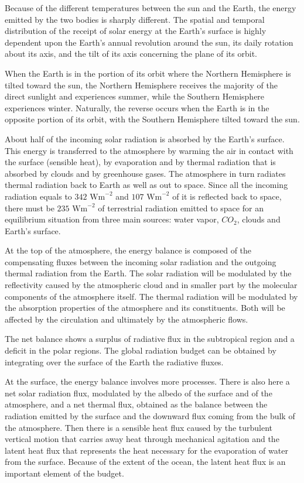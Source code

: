 Because of the different temperatures between the sun and the Earth, the energy emitted by the two bodies is sharply different. The spatial and temporal distribution of the receipt of solar energy at the Earth’s surface is highly dependent upon the Earth's annual revolution around the sun, its daily rotation about its axis, and the tilt of its axis concerning the plane of its orbit. 

When the Earth is in the portion of its orbit where the Northern Hemisphere is tilted toward the sun, the Northern Hemisphere receives the majority of the direct sunlight and experiences summer, while the Southern Hemisphere experiences winter. Naturally, the reverse occurs when the Earth is in the opposite portion of its orbit, with the Southern Hemisphere tilted toward the sun. 

About half of the incoming solar radiation is absorbed by the Earth's surface. This energy is transferred to the atmosphere by warming the air in contact with the surface (sensible heat), by evaporation and by thermal radiation that is absorbed by clouds and by greenhouse gases. The atmosphere in turn radiates thermal radiation back to Earth as well as out to space. Since all the
incoming radiation equals to $342 \,\, \text{Wm}^{-2}$ and $107 \,\, \text{Wm}^{-2}$ of it is reflected back to space, there must be
$235\,\, \text{Wm}^{-2}$ of terrestrial radiation emitted to space for an equilibrium situation from three main sources: water vapor, $CO_2$, clouds and Earth’s surface. 

 At the top of the atmosphere, the energy balance is composed of the compensating fluxes between the incoming solar radiation and the outgoing thermal radiation from the Earth. The solar radiation will be modulated by the reflectivity caused by the atmospheric cloud and in smaller part by the molecular components of the atmosphere itself. The thermal radiation will be modulated by the absorption properties of the atmosphere and its constituents. Both will be affected by the circulation and ultimately by the atmospheric flows. 

The net balance shows a surplus of radiative flux in the subtropical region and a deficit in the polar regions. The global radiation budget can be obtained by integrating over the surface of the Earth the radiative fluxes. 

At the surface, the energy balance involves more processes. There is also here a net solar radiation flux, modulated by the albedo of the surface and of the atmosphere, and a net thermal flux, obtained as the balance between the radiation emitted by the surface and the downward flux coming from the bulk of the atmosphere. Then there is a sensible heat flux caused by the turbulent vertical motion that carries away heat through mechanical agitation and the latent heat flux that represents the heat necessary for the evaporation of water from the surface. Because of the extent of the ocean, the latent heat flux is an important element of the budget. 

